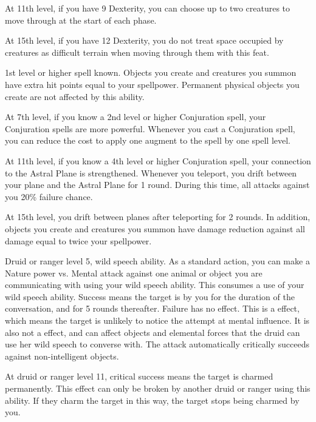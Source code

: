     At 11th level, if you have 9 Dexterity, you can choose up to two creatures to move through at the start of each phase.

    At 15th level, if you have 12 Dexterity, you do not treat space occupied by creatures as difficult terrain when moving through them with this feat.

    \featpres 1st level or higher  spell known.
    \featben Objects you create and creatures you summon have extra hit points equal to your spellpower.
    Permanent physical objects you create are not affected by this ability.

    At 7th level, if you know a 2nd level or higher Conjuration spell, your Conjuration spells are more powerful.
    Whenever you cast a Conjuration spell, you can reduce the cost to apply one augment to the spell by one spell level.

    At 11th level, if you know a 4th level or higher Conjuration spell, your connection to the Astral Plane is strengthened.
    Whenever you teleport, you drift between your plane and the Astral Plane for 1 round.
    During this time, all attacks against you 20\% failure chance.

    At 15th level, you drift between planes after teleporting for 2 rounds.
    In addition, objects you create and creatures you summon have damage reduction against all damage equal to twice your spellpower.

    \featpres Druid or ranger level 5, wild speech ability.
    \featben  As a standard action, you can make a Nature power vs. Mental attack against one animal or object you are communicating with using your wild speech ability.
    This consumes a use of your wild speech ability.
    Success means the target is \charmed by you for the duration of the conversation, and for 5 rounds thereafter.
    Failure has no effect.
    This is a  effect, which means the target is unlikely to notice the attempt at mental influence.
    It is also not a  effect, and can affect objects and elemental forces that the druid can use her wild speech to converse with.
    The attack automatically critically succeeds against non-intelligent objects.

    At druid or ranger level 11, critical success means the target is charmed permanently.
    This effect can only be broken by another druid or ranger using this ability.
    If they charm the target in this way, the target stops being charmed by you.

